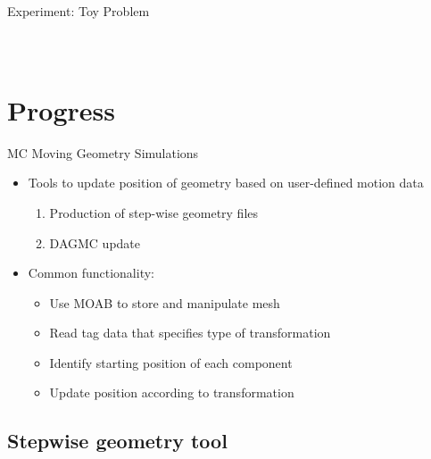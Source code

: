 \documentclass{beamer}
\begin{document}
\begin{frame}{Experiment: Toy Problem}
\begin{columns}
\begin{figure}
{\begin{tikzpicture}[every text node part/.style={align=center}]
	\end{tikzpicture}
        }
\end{figure}
\end{columns}
\end{frame}


\section{Progress}
\begin{frame}{MC Moving Geometry Simulations}
	\begin{itemize}
		\item{Tools to update position of geometry based on
			user-defined motion data}
			\begin{enumerate}
				\item{Production of step-wise geometry files}
				\item{DAGMC update}
			\end{enumerate}
		\item{Common functionality:}
			\begin{itemize}
				\item{Use MOAB to store and manipulate mesh}
				\item{Read tag data that specifies type of
					transformation}
				\item{Identify starting position of each
					component}
				\item{Update position according to
					transformation}
			\end{itemize}
	\end{itemize}
\end{frame}
\subsection{Stepwise geometry tool}
\end{document}
